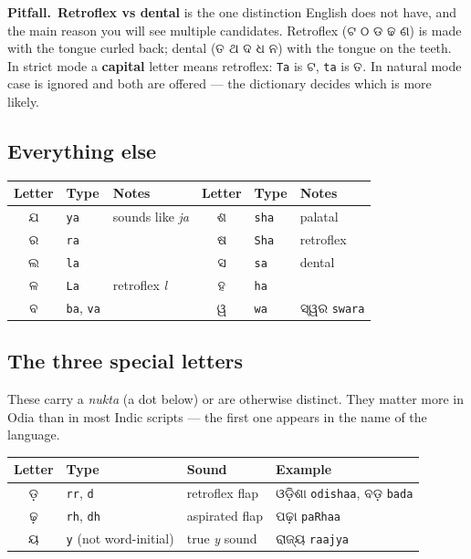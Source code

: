 \documentclass[11pt, a4paper]{article}
\newcommand{\od}[1]{{\odiafont #1}}          %
\newcommand{\odb}[1]{{\odiafont\large #1}}   %
\newcommand{\kpit}{{\color{midseaorange!85!black}\textbf{\textsf{Pitfall.}}}\ }
\begin{document}
\begin{warnbox}
\kpit \textbf{Retroflex vs dental} is the one distinction English does not have, and the
main reason you will see multiple candidates. Retroflex (\od{ଟ ଠ ଡ ଢ ଣ}) is made with the
tongue curled back; dental (\od{ତ ଥ ଦ ଧ ନ}) with the tongue on the teeth. In strict mode a
\textbf{capital} letter means retroflex: \texttt{Ta} is \od{ଟ}, \texttt{ta} is \od{ତ}. In
natural mode case is ignored and both are offered --- the dictionary decides which is
more likely.
\end{warnbox}

\subsection*{Everything else}

\begin{center}
\begin{tabular}{c l l c l l}
\toprule
Letter & Type & Notes & Letter & Type & Notes \\
\midrule
\odb{ଯ} & \texttt{ya} & sounds like \emph{ja} & \odb{ଶ} & \texttt{sha} & palatal \\
\odb{ର} & \texttt{ra} &                        & \odb{ଷ} & \texttt{Sha} & retroflex \\
\odb{ଲ} & \texttt{la} &                        & \odb{ସ} & \texttt{sa}  & dental \\
\odb{ଳ} & \texttt{La} & retroflex \emph{l}     & \odb{ହ} & \texttt{ha}  & \\
\odb{ବ} & \texttt{ba}, \texttt{va} &           & \odb{ୱ} & \texttt{wa}  & \od{ସ୍ୱର} \texttt{swara} \\
\bottomrule
\end{tabular}
\end{center}

\subsection*{The three special letters}

These carry a \emph{nukta} (a dot below) or are otherwise distinct. They matter more in
Odia than in most Indic scripts --- the first one appears in the name of the language.

\begin{center}
\begin{tabular}{c l l l}
\toprule
Letter & Type & Sound & Example \\
\midrule
\odb{ଡ଼} & \texttt{rr}, \texttt{d}    & retroflex flap        & \od{ଓଡ଼ିଶା} \texttt{odishaa}, \od{ବଡ଼} \texttt{bada} \\
\odb{ଢ଼} & \texttt{rh}, \texttt{dh}   & aspirated flap        & \od{ପଢ଼ା} \texttt{paRhaa} \\
\odb{ୟ}  & \texttt{y} (not word-initial) & true \emph{y} sound & \od{ରାଜ୍ୟ} \texttt{raajya} \\
\bottomrule
\end{tabular}
\end{center}
\end{document}
